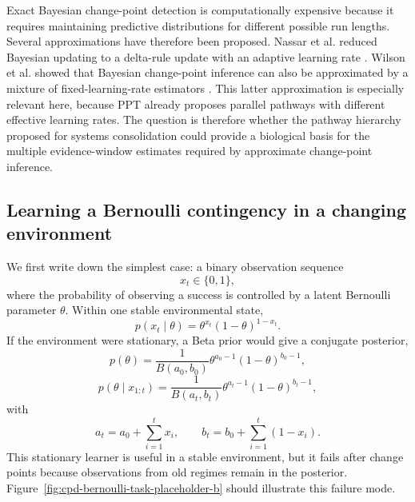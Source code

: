 Exact Bayesian change-point detection is computationally expensive because it requires maintaining predictive distributions for different possible run lengths. Several approximations have therefore been proposed. Nassar et al. reduced Bayesian updating to a delta-rule update with an adaptive learning rate \citep{Nassar2010}. Wilson et al. showed that Bayesian change-point inference can also be approximated by a mixture of fixed-learning-rate estimators \citep{Wilson2013}. This latter approximation is especially relevant here, because PPT already proposes parallel pathways with different effective learning rates. The question is therefore whether the pathway hierarchy proposed for systems consolidation could provide a biological basis for the multiple evidence-window estimates required by approximate change-point inference.

\subsection{Learning a Bernoulli contingency in a changing environment}
\label{sec:cpd-b-bernoulli}

We first write down the simplest case: a binary observation sequence
\begin{equation}
    x_t \in \{0,1\},
\end{equation}
where the probability of observing a success is controlled by a latent Bernoulli parameter \(\theta\). Within one stable environmental state,
\begin{equation}
    p(x_t \mid \theta)=\theta^{x_t}(1-\theta)^{1-x_t}.
\end{equation}
If the environment were stationary, a Beta prior would give a conjugate posterior,
\begin{equation}
    p(\theta)=\frac{1}{B(a_0,b_0)}\theta^{a_0-1}(1-\theta)^{b_0-1},
\end{equation}
\begin{equation}
    p(\theta \mid x_{1:t})
    =\frac{1}{B(a_t,b_t)}\theta^{a_t-1}(1-\theta)^{b_t-1},
\end{equation}
with
\begin{equation}
    a_t=a_0+\sum_{i=1}^{t}x_i,
    \qquad
    b_t=b_0+\sum_{i=1}^{t}(1-x_i).
\end{equation}
This stationary learner is useful in a stable environment, but it fails after change points because observations from old regimes remain in the posterior. Figure~\ref{fig:cpd-bernoulli-task-placeholder-b} should illustrate this failure mode.

